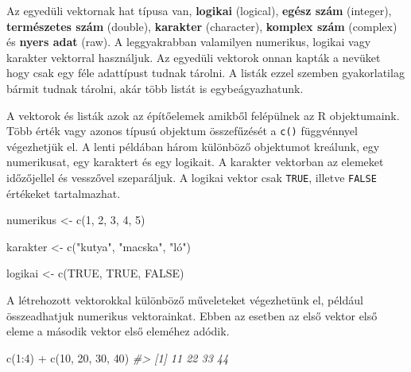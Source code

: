 \documentclass[
]{book}
\newenvironment{Shaded}{\begin{snugshade}}{\end{snugshade}}
\newcommand{\CommentTok}[1]{\textcolor[rgb]{0.56,0.35,0.01}{\textit{#1}}}
\newcommand{\ConstantTok}[1]{\textcolor[rgb]{0.00,0.00,0.00}{#1}}
\newcommand{\DecValTok}[1]{\textcolor[rgb]{0.00,0.00,0.81}{#1}}
\newcommand{\FunctionTok}[1]{\textcolor[rgb]{0.00,0.00,0.00}{#1}}
\newcommand{\NormalTok}[1]{#1}
\newcommand{\OtherTok}[1]{\textcolor[rgb]{0.56,0.35,0.01}{#1}}
\newcommand{\SpecialCharTok}[1]{\textcolor[rgb]{0.00,0.00,0.00}{#1}}
\newcommand{\StringTok}[1]{\textcolor[rgb]{0.31,0.60,0.02}{#1}}
\begin{document}
Az egyedüli vektornak hat típusa van, \textbf{logikai} (logical),
\textbf{egész szám} (integer), \textbf{természetes szám} (double),
\textbf{karakter} (character), \textbf{komplex szám} (complex) és
\textbf{nyers adat} (raw). A leggyakrabban valamilyen numerikus, logikai
vagy karakter vektorral használjuk. Az egyedüli vektorok onnan kapták a
nevüket hogy csak egy féle adattípust tudnak tárolni. A listák ezzel
szemben gyakorlatilag bármit tudnak tárolni, akár több listát is
egybeágyazhatunk.

A vektorok és listák azok az építőelemek amikből felépülnek az R
objektumaink. Több érték vagy azonos típusú objektum összefűzését a
\texttt{c()} függvénnyel végezhetjük el. A lenti példában három
különböző objektumot kreálunk, egy numerikusat, egy karaktert és egy
logikait. A karakter vektorban az elemeket időzőjellel és vesszővel
szeparáljuk. A logikai vektor csak \texttt{TRUE}, illetve \texttt{FALSE}
értékeket tartalmazhat.

\begin{Shaded}
\begin{Highlighting}[]
\NormalTok{numerikus }\OtherTok{\textless{}{-}} \FunctionTok{c}\NormalTok{(}\DecValTok{1}\NormalTok{, }\DecValTok{2}\NormalTok{, }\DecValTok{3}\NormalTok{, }\DecValTok{4}\NormalTok{, }\DecValTok{5}\NormalTok{)}

\NormalTok{karakter }\OtherTok{\textless{}{-}} \FunctionTok{c}\NormalTok{(}\StringTok{"kutya"}\NormalTok{, }\StringTok{"macska"}\NormalTok{, }\StringTok{"ló"}\NormalTok{)}

\NormalTok{logikai }\OtherTok{\textless{}{-}} \FunctionTok{c}\NormalTok{(}\ConstantTok{TRUE}\NormalTok{, }\ConstantTok{TRUE}\NormalTok{, }\ConstantTok{FALSE}\NormalTok{)}
\end{Highlighting}
\end{Shaded}

A létrehozott vektorokkal különböző műveleteket végezhetünk el, például
összeadhatjuk numerikus vektorainkat. Ebben az esetben az első vektor
első eleme a második vektor első eleméhez adódik.

\begin{Shaded}
\begin{Highlighting}[]
\FunctionTok{c}\NormalTok{(}\DecValTok{1}\SpecialCharTok{:}\DecValTok{4}\NormalTok{) }\SpecialCharTok{+} \FunctionTok{c}\NormalTok{(}\DecValTok{10}\NormalTok{, }\DecValTok{20}\NormalTok{, }\DecValTok{30}\NormalTok{, }\DecValTok{40}\NormalTok{)}
\CommentTok{\#\textgreater{} [1] 11 22 33 44}
\end{Highlighting}
\end{Shaded}
\end{document}
